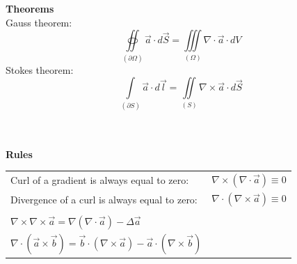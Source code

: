 \textbf{\\ \\ Theorems\\}
	Gauss theorem:
	\begin{equation*}
		\oiint\limits_{\left(\partial \Omega\right)} \vec{a} \cdot d\vec{S} = \iiint\limits_{\left(\Omega\right)} \nabla \cdot \vec{a} \cdot dV
	\end{equation*}
	Stokes theorem:
	\begin{equation*}
		\int\limits_{\left(\partial S\right)} \vec{a} \cdot d\vec{l} = \iint\limits_{\left(S\right)} \nabla \times \vec{a} \cdot d\vec{S}
	\end{equation*}
	
\textbf{\\ \\ Rules \\}
\begin{tabular}{ll}
	Curl of a gradient is always equal to zero: & \(\displaystyle \nabla \times \left(\nabla \cdot \vec{a} \right) \equiv 0\) \\
	Divergence of a curl is always equal to zero: & \(\displaystyle \nabla \cdot \left(\nabla \times \vec{a}\right) \equiv 0 \)\\ \\
	\(\displaystyle \nabla \times \nabla \times \vec{a} = \nabla \left(\nabla \cdot \vec{a}\right) - \Delta \vec{a}\) \\
	\(\displaystyle \nabla \cdot \left(\vec{a} \times \vec{b}\right) = \vec{b} \cdot \left(\nabla \times \vec{a}\right) - \vec{a} \cdot \left(\nabla \times \vec{b}\right)\) 
\end{tabular}

